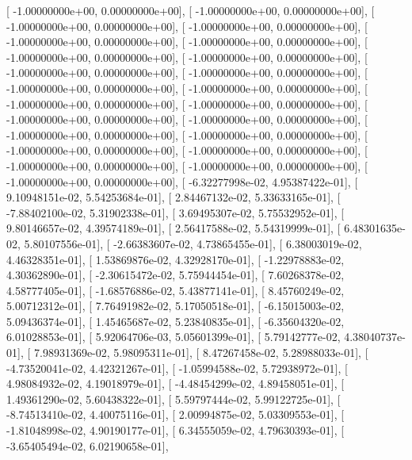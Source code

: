 \documentclass{article}
\begin{document}
       [ -1.00000000e+00,   0.00000000e+00],
       [ -1.00000000e+00,   0.00000000e+00],
       [ -1.00000000e+00,   0.00000000e+00],
       [ -1.00000000e+00,   0.00000000e+00],
       [ -1.00000000e+00,   0.00000000e+00],
       [ -1.00000000e+00,   0.00000000e+00],
       [ -1.00000000e+00,   0.00000000e+00],
       [ -1.00000000e+00,   0.00000000e+00],
       [ -1.00000000e+00,   0.00000000e+00],
       [ -1.00000000e+00,   0.00000000e+00],
       [ -1.00000000e+00,   0.00000000e+00],
       [ -1.00000000e+00,   0.00000000e+00],
       [ -1.00000000e+00,   0.00000000e+00],
       [ -1.00000000e+00,   0.00000000e+00],
       [ -1.00000000e+00,   0.00000000e+00],
       [ -1.00000000e+00,   0.00000000e+00],
       [ -1.00000000e+00,   0.00000000e+00],
       [ -1.00000000e+00,   0.00000000e+00],
       [ -1.00000000e+00,   0.00000000e+00],
       [ -1.00000000e+00,   0.00000000e+00],
       [ -1.00000000e+00,   0.00000000e+00],
       [ -1.00000000e+00,   0.00000000e+00],
       [ -1.00000000e+00,   0.00000000e+00],
       [ -6.32277998e-02,   4.95387422e-01],
       [  9.10948151e-02,   5.54253684e-01],
       [  2.84467132e-02,   5.33633165e-01],
       [ -7.88402100e-02,   5.31902338e-01],
       [  3.69495307e-02,   5.75532952e-01],
       [  9.80146657e-02,   4.39574189e-01],
       [  2.56417588e-02,   5.54319999e-01],
       [  6.48301635e-02,   5.80107556e-01],
       [ -2.66383607e-02,   4.73865455e-01],
       [  6.38003019e-02,   4.46328351e-01],
       [  1.53869876e-02,   4.32928170e-01],
       [ -1.22978883e-02,   4.30362890e-01],
       [ -2.30615472e-02,   5.75944454e-01],
       [  7.60268378e-02,   4.58777405e-01],
       [ -1.68576886e-02,   5.43877141e-01],
       [  8.45760249e-02,   5.00712312e-01],
       [  7.76491982e-02,   5.17050518e-01],
       [ -6.15015003e-02,   5.09436374e-01],
       [  1.45465687e-02,   5.23840835e-01],
       [ -6.35604320e-02,   6.01028853e-01],
       [  5.92064706e-03,   5.05601399e-01],
       [  5.79142777e-02,   4.38040737e-01],
       [  7.98931369e-02,   5.98095311e-01],
       [  8.47267458e-02,   5.28988033e-01],
       [ -4.73520041e-02,   4.42321267e-01],
       [ -1.05994588e-02,   5.72938972e-01],
       [  4.98084932e-02,   4.19018979e-01],
       [ -4.48454299e-02,   4.89458051e-01],
       [  1.49361290e-02,   5.60438322e-01],
       [  5.59797444e-02,   5.99122725e-01],
       [ -8.74513410e-02,   4.40075116e-01],
       [  2.00994875e-02,   5.03309553e-01],
       [ -1.81048998e-02,   4.90190177e-01],
       [  6.34555059e-02,   4.79630393e-01],
       [ -3.65405494e-02,   6.02190658e-01],
\end{document}
